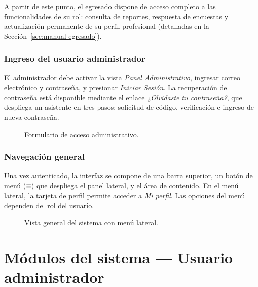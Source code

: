 A partir de este punto, el egresado dispone de acceso completo a las funcionalidades de su rol: consulta de reportes, respuesta de encuestas y actualización permanente de su perfil profesional (detalladas en la Sección~\ref{sec:manual-egresado}).

\subsubsection{Ingreso del usuario administrador}

El administrador debe activar la vista \emph{Panel Administrativo}, ingresar correo electrónico y contraseña, y presionar \emph{Iniciar Sesión}. La recuperación de contraseña está disponible mediante el enlace \emph{¿Olvidaste tu contraseña?}, que despliega un asistente en tres pasos: solicitud de código, verificación e ingreso de nueva contraseña.

\begin{figure}[H]
\centering
{}
\caption{Formulario de acceso administrativo.}
\label{fig:login-admin}
\end{figure}

\subsubsection{Navegación general}

Una vez autenticado, la interfaz se compone de una barra superior, un botón de menú (\texttt{☰}) que despliega el panel lateral, y el área de contenido. En el menú lateral, la tarjeta de perfil permite acceder a \emph{Mi perfil}. Las opciones del menú dependen del rol del usuario.

\begin{figure}[H]
\centering
{}
\caption{Vista general del sistema con menú lateral.}
\label{fig:layout}
\end{figure}

\section{Módulos del sistema --- Usuario administrador}
\label{sec:manual-admin}

